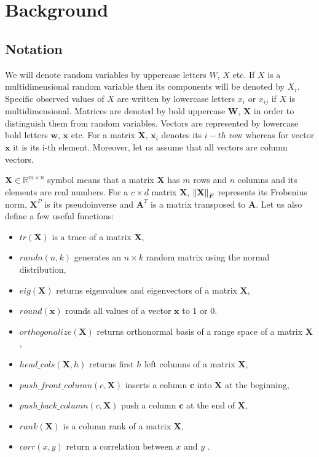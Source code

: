 
\chapter{Background}
\section{Notation}

We will denote random variables by uppercase letters $W$, $X$ etc. If $X$ is a multidimensional random variable then its components will be denoted by $X_i$. Specific observed values of $X$ are written by lowercase letters $x_i$ or $x_{ij}$ if $X$ is multidimensional. Matrices are denoted by bold uppercase $\boldsymbol{W}$, $\boldsymbol{X}$ in order to distinguish them from random variables. Vectors are represented by lowercase bold letters $\boldsymbol{w}$, $\boldsymbol{x}$ etc. For a matrix $\boldsymbol{X}$, $\boldsymbol{x}_{i}$ denotes its $i-th$ row whereas for vector $\boldsymbol{x}$ it is its i-th element. Moreover, let us assume that all vectors are column vectors. 

$\boldsymbol{X} \in \mathbb{R}^{m \times n}$ symbol means that a matrix $\boldsymbol{X}$ has $m$ rows and $n$ columns and its elements are real numbers. For a $c \times d$  matrix $\boldsymbol{X}$, $\left\lVert\textbf{X}\right\rVert_{F}$ represents its Frobenius norm, $\textbf{X}^P$ is its pseudoinverse and $\textbf{A}^T$ is a matrix transposed to $\textbf{A}$. 
Let us also define a few useful functions:
\begin{itemize}
\item $tr(\boldsymbol{X})$ is a trace of a matrix $\boldsymbol{X}$, 
\item $randn(n,k)$ generates an $n \times k$ random matrix using the normal distribution,
\item $eig(\boldsymbol{X})$ returns eigenvalues and eigenvectors of a matrix $\boldsymbol{X}$,
\item $round(\boldsymbol{x})$ rounds all values of a vector $\boldsymbol{x}$ to $1$ or $0$.
\item $orthogonalize(\boldsymbol{X})$ returns orthonormal basis of a range space of a matrix $\boldsymbol{X}$,
\item $head\_cols(\boldsymbol{X},h)$ returns first $h$ left columns of a matrix $\boldsymbol{X}$,
\item $push\_front\_column(c,\boldsymbol{X})$ inserts a column $\boldsymbol{c}$ into $\boldsymbol{X}$ at the beginning,
\item $push\_back\_column(c,\boldsymbol{X})$ push a column $\boldsymbol{c}$ at the end of $\boldsymbol{X}$,
\item $rank(\boldsymbol{X})$ is a column rank of a matrix $\boldsymbol{X}$,
\item $corr(x,y)$ return a correlation between $x$ and $y$ . 

\end{itemize}

